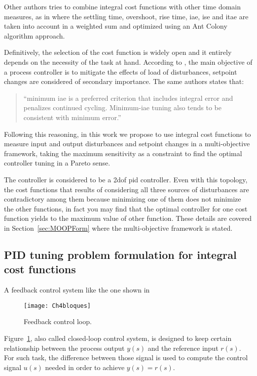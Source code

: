 Other authors tries to combine integral cost functions with other time domain measures, as in \citet{Chiha2012} where the settling time, overshoot, rise time, \gls{iae}, \gls{ise} and \gls{itae} are taken into account in a weighted sum and optimized using an Ant Colony algorithm approach.

Definitively, the selection of the cost function is widely open and it entirely depends on the necessity of the task at hand. According to \citet{Shinskey2002}, the main objective of a process controller is to mitigate the effects of load of disturbances, setpoint changes are considered of secondary importance. The same authors states that: \begin{quote}
	``minimum \gls{iae} is a preferred criterion that includes integral error and penalizes continued cycling. Minimum-\gls{iae} tuning also tends to be consistent with minimum error.''
\end{quote}
%

Following this reasoning, in this work we propose to use integral cost functions to measure input and output disturbances and setpoint changes in a multi-objective framework, taking the maximum sensitivity as a constraint to find the optimal controller tuning in a Pareto sense.

The controller is considered to be a \gls{2dof} \gls{pid} controller. Even with this topology, the cost functions that results of considering all three sources of disturbances are contradictory among them because minimizing one of them does not minimize the other functions, in fact you may find that the optimal controller for one cost function yields to the maximum value of other function. These details are covered in Section~\ref{sec:MOOPForm} where the multi-objective framework is stated.

\subsection{PID tuning problem formulation for integral cost functions}
\label{sec:CostProbPID}
A feedback control system like the one shown in %
\begin{figure}[tb]
	\centering
	\texttt{[image: Ch4bloques]}%
	\caption{Feedback control loop.}%
	\label{fig:bloques}%
\end{figure}
%
Figure~\ref{fig:bloques}, also called closed-loop control system, is designed to keep certain relationship between the process output $y(s)$ and the reference input $r(s)$. For such task, the difference between those signal is used to compute the control signal $u(s)$ needed in order to achieve $y(s)=r(s)$. 

